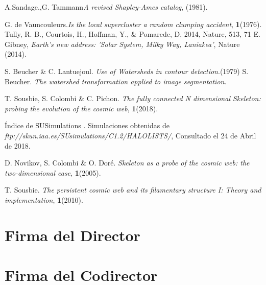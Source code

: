 \documentclass[12pt]{article}
\begin{document}
\begin{thebibliography}{10}

 A.Sandage.,G. Tammann\textit{A revised Shapley-Ames catalog}, (1981).

 G. de Vauncouleurs.\textit{Is the local supercluster a random clumping accident}, \textbf{1}(1976).
 Tully, R. B., Courtois, H., Hoffman, Y., \& Pomarede, D, 2014, Nature, 513, 71
 E. Gibney, \textit{Earth's new address: 'Solar System, Milky Way, Laniakea'}, Nature (2014).




 S. Beucher \& C. Lantuejoul. \textit{Use of Watersheds in contour detection}.(1979) 
 S. Beucher. \textit{The watershed transformation applied to image segmentation}.

 T. Sousbie, S. Colombi \& C. Pichon. \textit{The fully connected N dimensional Skeleton: probing the evolution of the cosmic web}, \textbf{1}(2018).

 Índice de SUSimulations . Simulaciones obtenidas de \textit{ftp://skun.iaa.es/SUsimulations/C1.2/HALOLISTS/}, Consultado el 24 de Abril de 2018.


 D. Novikov, S. Colombi \& O. Doré. \textit{Skeleton as a probe of the cosmic web: the two-dimensional case}, \textbf{1}(2005).

 T. Sousbie. \textit{The persistent cosmic web and its filamentary structure I: Theory and implementation}, \textbf{1}(2010).










\end{thebibliography}

\section*{Firma del Director}
\vspace{1.5cm}

\section*{Firma del Codirector	}
\end{document}
